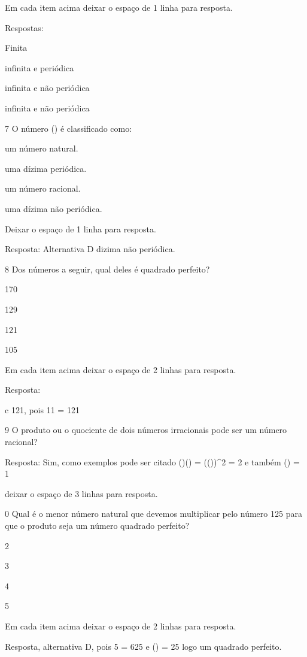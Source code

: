 Em cada item acima deixar o espaço de 1 linha para resposta.

Respostas:

\item Finita
\item infinita e periódica
\item infinita e não periódica
\item infinita e não periódica

\num{7} O número (\pi) é classificado como:

\item um número natural.
\item uma dízima periódica.
\item um número racional.
\item uma dízima não periódica.

Deixar o espaço de 1 linha para resposta.

Resposta: Alternativa D dizima não periódica.

\num{8} Dos números a seguir, qual deles é quadrado perfeito?

\item 170
\item 129
\item 121
\item 105

Em cada item acima deixar o espaço de 2 linhas para resposta.

Resposta:

c 121, pois 11 = 121

\num{9} O produto ou o quociente de dois números irracionais pode ser um
número racional?

Resposta: Sim, como exemplos pode ser citado ()\times ()
= (())^2 = 2 e também () = 1

deixar o espaço de 3 linhas para resposta.

\num{0} Qual é o menor número natural que devemos multiplicar pelo número
125 para que o produto seja um número quadrado perfeito?

\item 2
\item 3
\item 4
\item 5

Em cada item acima deixar o espaço de 2 linhas para resposta.

Resposta, alternativa D, pois 5 = 625 e () = 25 logo
um quadrado perfeito.

